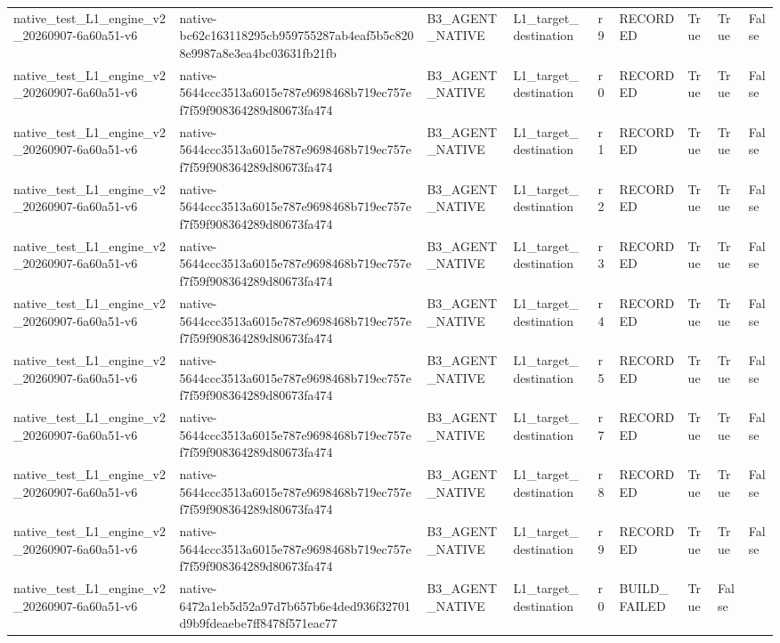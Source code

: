 \begin{tabular}{lllllllll}
native\_test\_L1\_engine\_v2\_20260907-6a60a51-v6 & native-bc62c163118295cb959755287ab4eaf5b5c8208e9987a8e3ea4bc03631fb21fb & B3\_AGENT\_NATIVE & L1\_target\_destination & r9 & RECORDED & True & True & False \\
native\_test\_L1\_engine\_v2\_20260907-6a60a51-v6 & native-5644ccc3513a6015e787e9698468b719ec757ef7f59f908364289d80673fa474 & B3\_AGENT\_NATIVE & L1\_target\_destination & r0 & RECORDED & True & True & False \\
native\_test\_L1\_engine\_v2\_20260907-6a60a51-v6 & native-5644ccc3513a6015e787e9698468b719ec757ef7f59f908364289d80673fa474 & B3\_AGENT\_NATIVE & L1\_target\_destination & r1 & RECORDED & True & True & False \\
native\_test\_L1\_engine\_v2\_20260907-6a60a51-v6 & native-5644ccc3513a6015e787e9698468b719ec757ef7f59f908364289d80673fa474 & B3\_AGENT\_NATIVE & L1\_target\_destination & r2 & RECORDED & True & True & False \\
native\_test\_L1\_engine\_v2\_20260907-6a60a51-v6 & native-5644ccc3513a6015e787e9698468b719ec757ef7f59f908364289d80673fa474 & B3\_AGENT\_NATIVE & L1\_target\_destination & r3 & RECORDED & True & True & False \\
native\_test\_L1\_engine\_v2\_20260907-6a60a51-v6 & native-5644ccc3513a6015e787e9698468b719ec757ef7f59f908364289d80673fa474 & B3\_AGENT\_NATIVE & L1\_target\_destination & r4 & RECORDED & True & True & False \\
native\_test\_L1\_engine\_v2\_20260907-6a60a51-v6 & native-5644ccc3513a6015e787e9698468b719ec757ef7f59f908364289d80673fa474 & B3\_AGENT\_NATIVE & L1\_target\_destination & r5 & RECORDED & True & True & False \\
native\_test\_L1\_engine\_v2\_20260907-6a60a51-v6 & native-5644ccc3513a6015e787e9698468b719ec757ef7f59f908364289d80673fa474 & B3\_AGENT\_NATIVE & L1\_target\_destination & r7 & RECORDED & True & True & False \\
native\_test\_L1\_engine\_v2\_20260907-6a60a51-v6 & native-5644ccc3513a6015e787e9698468b719ec757ef7f59f908364289d80673fa474 & B3\_AGENT\_NATIVE & L1\_target\_destination & r8 & RECORDED & True & True & False \\
native\_test\_L1\_engine\_v2\_20260907-6a60a51-v6 & native-5644ccc3513a6015e787e9698468b719ec757ef7f59f908364289d80673fa474 & B3\_AGENT\_NATIVE & L1\_target\_destination & r9 & RECORDED & True & True & False \\
native\_test\_L1\_engine\_v2\_20260907-6a60a51-v6 & native-6472a1eb5d52a97d7b657b6e4ded936f32701d9b9fdeaebe7ff8478f571eac77 & B3\_AGENT\_NATIVE & L1\_target\_destination & r0 & BUILD\_FAILED & True & False &  \\

\end{tabular}
